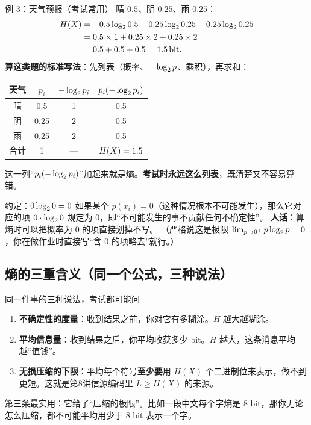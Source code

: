 \begin{calc}{例 3：天气预报（考试常用）}
晴 $0.5$、阴 $0.25$、雨 $0.25$：
\begin{align*}
H\!\left(X\right)&=-0.5\log_{2}0.5-0.25\log_{2}0.25-0.25\log_{2}0.25\\
&=0.5\times1+0.25\times2+0.25\times2\\
&=0.5+0.5+0.5=1.5\,\text{bit} .
\end{align*}
\textbf{算这类题的标准写法}：先列表（概率、$-\log_{2} p$、乘积），再求和：
\begin{center}
\renewcommand{\arraystretch}{1.25}
\begin{tabular}{c|c|c|c}
\toprule
天气 & $p_i$ & $-\log_{2} p_i$ & $p_i(-\log_{2} p_i)$\\
\midrule
晴 & 0.5 & 1 & 0.5\\
阴 & 0.25 & 2 & 0.5\\
雨 & 0.25 & 2 & 0.5\\
\midrule
合计 & 1 & — & $H\!\left(X\right)=1.5$\\
\bottomrule
\end{tabular}
\end{center}
这一列“$p_i(-\log_{2} p_i)$”加起来就是熵。\textbf{考试时永远这么列表}，既清楚又不容易算错。
\end{calc}

\begin{defbox}{约定：$0\log_{2} 0=0$}
如果某个 $p(x_i)=0$（这种情况根本不可能发生），那么它对应的项 $0\cdot\log_{2} 0$ 规定为 $0$，即“不可能发生的事不贡献任何不确定性”。
\textbf{人话}：算熵时可以把概率为 0 的项直接划掉不写。
（严格说这是极限 $\lim_{p\to0^+}p\log_{2} p=0$，你在做作业时直接写“含 0 的项略去”就行。）
\end{defbox}

\subsection{熵的三重含义（同一个公式，三种说法）}

\begin{idea}{同一件事的三种说法，考试都可能问}
\begin{enumerate}[leftmargin=1.6em,itemsep=2pt,topsep=2pt]
  \item \textbf{不确定性的度量}：收到结果之前，你对它有多糊涂。$H$ 越大越糊涂。
  \item \textbf{平均信息量}：收到结果之后，你平均收获多少 bit。$H$ 越大，这条消息平均越“值钱”。
  \item \textbf{无损压缩的下限}：平均每个符号\textbf{至少要}用 $H(X)$ 个二进制位来表示，做不到更短。这就是第8讲信源编码里 $\bar L\ge H(X)$ 的来源。
\end{enumerate}
第三条最实用：它给了“压缩的极限”。比如一段中文每个字熵是 8 bit，那你无论怎么压缩，都不可能平均用少于 8 bit 表示一个字。
\end{idea}

